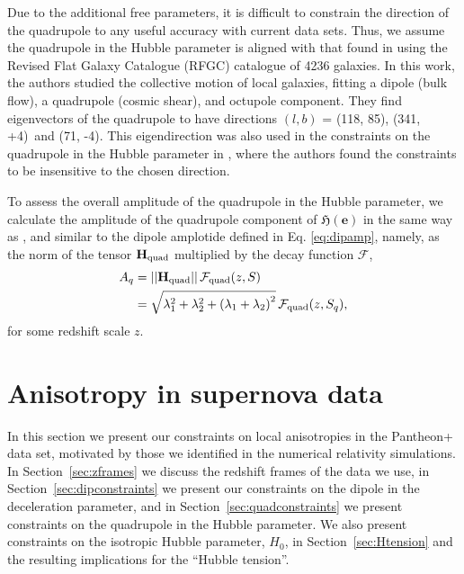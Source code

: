 \documentclass[fleqn,usenatbib]{mnras}
\begin{document}
Due to the %
{additional} free parameters, it is difficult to constrain the direction of the quadrupole {to any useful accuracy with current data sets. Thus,} %
we assume %
{the quadrupole in the Hubble parameter is aligned} with %
{that} found in \citet{Parnovsky} {using the Revised Flat Galaxy Catalogue (RFGC) catalogue of 4236 galaxies.  
}
{In this work, the authors studied the} collective motion of local galaxies, fitting a dipole (bulk flow), a quadrupole (cosmic shear), and octupole component. They find eigenvectors {of the quadrupole} %
to have directions $(l, b)$ = (118, 85)\textdegree, (341, +4)\textdegree\ and (71, -4)\textdegree. This eigendirection was also used in the constraints on the quadrupole in the Hubble parameter in , where the authors found the constraints to be %
{{insensitive to} the chosen direction. }

{%
{To assess the overall amplitude of the quadrupole in the Hubble parameter, we calculate} %
the amplitude of the quadrupole component of $\mathfrak{H}(\boldsymbol{e})$ in the same way as , and similar to the dipole amplotide defined in Eq. \ref{eq:dipamp}, {namely,} as the norm of the tensor ${\bf H_{\rm quad}}$ multiplied by the decay function $\mathcal{F}$, %
\begin{align}
    A_q &= || {\bf H_{\rm quad}} || \,\mathcal{F}_{\rm quad}(z,S) \\
    & = \sqrt{\lambda_1^2 + \lambda_2^2 + \left(\lambda_1 + \lambda_2\right)^2}\, \mathcal{F}_{\rm quad}(z,S_q), \label{eq:ampcalc}
\end{align}
for some redshift scale $z$. 
}

\section{Anisotropy in supernova data}
\label{sec:obs_results}
{In this section we present our constraints on local anisotropies in the Pantheon+ data set, motivated by those we identified in the numerical relativity simulations. 
In Section~\ref{sec:zframes} we discuss the redshift frames of the data we use, in Section~\ref{sec:dipconstraints} we present our constraints on the dipole in the deceleration parameter, and in Section~\ref{sec:quadconstraints} we present constraints on the quadrupole in the Hubble parameter. We also present constraints on the isotropic Hubble parameter, $H_0$, in Section~\ref{sec:Htension} and the resulting implications for the ``Hubble tension''.}
\end{document}
